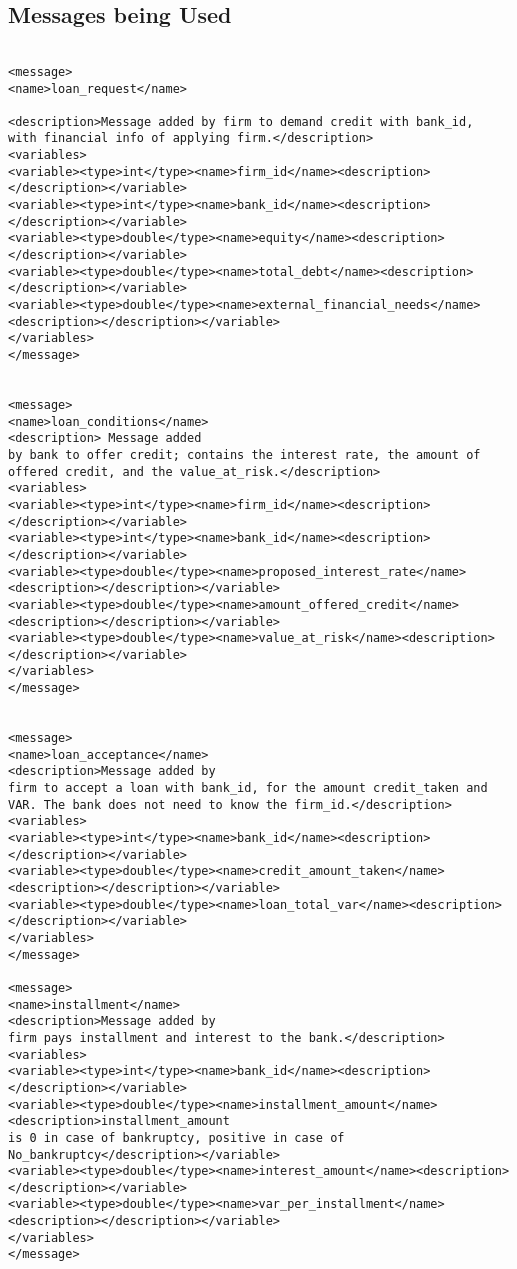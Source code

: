\subsection{Messages being Used}
\begin{mylisting}
\begin{verbatim}

<message> 
<name>loan_request</name>

<description>Message added by firm to demand credit with bank_id,
with financial info of applying firm.</description> 
<variables>
<variable><type>int</type><name>firm_id</name><description></description></variable>
<variable><type>int</type><name>bank_id</name><description></description></variable>
<variable><type>double</type><name>equity</name><description></description></variable>
<variable><type>double</type><name>total_debt</name><description></description></variable>
<variable><type>double</type><name>external_financial_needs</name><description></description></variable>
</variables> 
</message>


<message> 
<name>loan_conditions</name> 
<description> Message added
by bank to offer credit; contains the interest rate, the amount of
offered credit, and the value_at_risk.</description> 
<variables>
<variable><type>int</type><name>firm_id</name><description></description></variable>
<variable><type>int</type><name>bank_id</name><description></description></variable>
<variable><type>double</type><name>proposed_interest_rate</name><description></description></variable>
<variable><type>double</type><name>amount_offered_credit</name><description></description></variable>
<variable><type>double</type><name>value_at_risk</name><description></description></variable>
</variables> 
</message>


<message> 
<name>loan_acceptance</name> 
<description>Message added by
firm to accept a loan with bank_id, for the amount credit_taken and
VAR. The bank does not need to know the firm_id.</description>
<variables>
<variable><type>int</type><name>bank_id</name><description></description></variable>
<variable><type>double</type><name>credit_amount_taken</name><description></description></variable>
<variable><type>double</type><name>loan_total_var</name><description></description></variable>
</variables> 
</message>

<message> 
<name>installment</name> 
<description>Message added by
firm pays installment and interest to the bank.</description>
<variables>
<variable><type>int</type><name>bank_id</name><description></description></variable>
<variable><type>double</type><name>installment_amount</name><description>installment_amount
is 0 in case of bankruptcy, positive in case of
No_bankruptcy</description></variable>
<variable><type>double</type><name>interest_amount</name><description></description></variable>
<variable><type>double</type><name>var_per_installment</name><description></description></variable>
</variables> 
</message>


\end{verbatim}
\end{mylisting}
